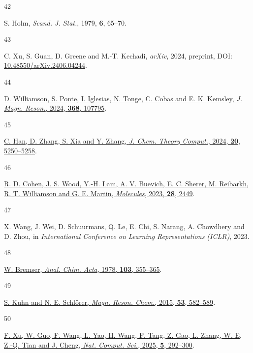 \documentclass[
  10pt,
]{article}
\newlength{\cslhangindent}
\newlength{\csllabelwidth}
\newlength{\cslentryspacingunit} %
\newenvironment{CSLReferences}[2] %
 {%
  \setlength{\parindent}{0pt}
  \ifodd #1
  \let\oldpar\par
  \def\par{\hangindent=\cslhangindent\oldpar}
  \fi
  \setlength{\parskip}{#2\cslentryspacingunit}
 }%
 {}
\newcommand{\CSLLeftMargin}[1]{\parbox[t]{\csllabelwidth}{#1}}
\newcommand{\CSLRightInline}[1]{\parbox[t]{\linewidth - \csllabelwidth}{#1}\break}
\begin{document}
\begin{CSLReferences}{0}{0}
\leavevmode{}%
\CSLLeftMargin{42 }%
\CSLRightInline{S. Holm, \emph{Scand. J. Stat.}, 1979, \textbf{6},
65--70.}

\leavevmode{}%
\CSLLeftMargin{43 }%
\CSLRightInline{C. Xu, S. Guan, D. Greene and M.-T. Kechadi,
\emph{arXiv}, 2024, preprint, DOI:
\href{https://doi.org/10.48550/arXiv.2406.04244}{10.48550/arXiv.2406.04244}.}

\leavevmode{}%
\CSLLeftMargin{44 }%
\CSLRightInline{\href{https://doi.org/10.1016/j.jmr.2024.107795}{D.
Williamson, S. Ponte, I. Iglesias, N. Tonge, C. Cobas and E. K. Kemsley,
\emph{J. Magn. Reson.}, 2024, \textbf{368}, 107795}.}

\leavevmode{}%
\CSLLeftMargin{45 }%
\CSLRightInline{\href{https://doi.org/10.1021/acs.jctc.4c00422}{C. Han,
D. Zhang, S. Xia and Y. Zhang, \emph{J. Chem. Theory Comput.}, 2024,
\textbf{20}, 5250--5258}.}

\leavevmode{}%
\CSLLeftMargin{46 }%
\CSLRightInline{\href{https://doi.org/10.3390/molecules28062449}{R. D.
Cohen, J. S. Wood, Y.-H. Lam, A. V. Buevich, E. C. Sherer, M. Reibarkh,
R. T. Williamson and G. E. Martin, \emph{Molecules}, 2023, \textbf{28},
2449}.}

\leavevmode{}%
\CSLLeftMargin{47 }%
\CSLRightInline{X. Wang, J. Wei, D. Schuurmans, Q. Le, E. Chi, S.
Narang, A. Chowdhery and D. Zhou, in \emph{International Conference on
Learning Representations (ICLR)}, 2023.}

\leavevmode{}%
\CSLLeftMargin{48 }%
\CSLRightInline{\href{https://doi.org/10.1016/S0003-2670(01)83100-7}{W.
Bremser, \emph{Anal. Chim. Acta}, 1978, \textbf{103}, 355--365}.}

\leavevmode{}%
\CSLLeftMargin{49 }%
\CSLRightInline{\href{https://doi.org/10.1002/mrc.4263}{S. Kuhn and N.
E. Schlörer, \emph{Magn. Reson. Chem.}, 2015, \textbf{53}, 582--589}.}

\leavevmode{}%
\CSLLeftMargin{50 }%
\CSLRightInline{\href{https://doi.org/10.1038/s43588-025-00783-z}{F. Xu,
W. Guo, F. Wang, L. Yao, H. Wang, F. Tang, Z. Gao, L. Zhang, W. E, Z.-Q.
Tian and J. Cheng, \emph{Nat. Comput. Sci.}, 2025, \textbf{5},
292--300}.}


\end{CSLReferences}
\end{document}
